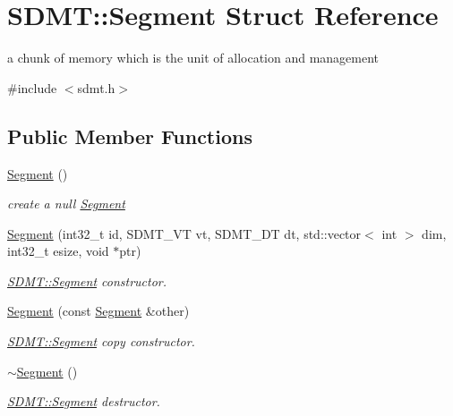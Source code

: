 \hypertarget{struct_s_d_m_t_1_1_segment}{}\section{S\+D\+MT\+:\+:Segment Struct Reference}
\label{struct_s_d_m_t_1_1_segment}


a chunk of memory which is the unit of allocation and management  




{\ttfamily \#include $<$sdmt.\+h$>$}

\subsection*{Public Member Functions}
\begin{DoxyCompactItemize}
\item 
\hyperlink{struct_s_d_m_t_1_1_segment_a0f4b0aa7fa5596a96a84129f010f19b6}{Segment} ()\hypertarget{struct_s_d_m_t_1_1_segment_a0f4b0aa7fa5596a96a84129f010f19b6}{}\label{struct_s_d_m_t_1_1_segment_a0f4b0aa7fa5596a96a84129f010f19b6}

\begin{DoxyCompactList}\small\item\em create a null \hyperlink{struct_s_d_m_t_1_1_segment}{Segment} \end{DoxyCompactList}\item 
\hyperlink{struct_s_d_m_t_1_1_segment_a386954456945a0bfb2634e6e3ae2b6a6}{Segment} (int32\+\_\+t id, S\+D\+M\+T\+\_\+\+VT vt, S\+D\+M\+T\+\_\+\+DT dt, std\+::vector$<$ int $>$ dim, int32\+\_\+t esize, void $\ast$ptr)
\begin{DoxyCompactList}\small\item\em \hyperlink{struct_s_d_m_t_1_1_segment}{S\+D\+M\+T\+::\+Segment} constructor. \end{DoxyCompactList}\item 
\hyperlink{struct_s_d_m_t_1_1_segment_a119578504b0ab9d498d506aea0a169f5}{Segment} (const \hyperlink{struct_s_d_m_t_1_1_segment}{Segment} \&other)
\begin{DoxyCompactList}\small\item\em \hyperlink{struct_s_d_m_t_1_1_segment}{S\+D\+M\+T\+::\+Segment} copy constructor. \end{DoxyCompactList}\item 
\hyperlink{struct_s_d_m_t_1_1_segment_a9da129d3aacb44861d18c2e97986aa55}{$\sim$\+Segment} ()\hypertarget{struct_s_d_m_t_1_1_segment_a9da129d3aacb44861d18c2e97986aa55}{}\label{struct_s_d_m_t_1_1_segment_a9da129d3aacb44861d18c2e97986aa55}

\begin{DoxyCompactList}\small\item\em \hyperlink{struct_s_d_m_t_1_1_segment}{S\+D\+M\+T\+::\+Segment} destructor. \end{DoxyCompactList}\end{DoxyCompactItemize}
